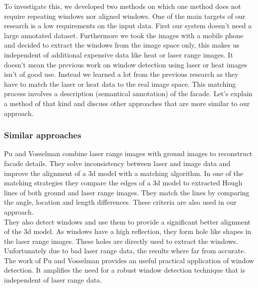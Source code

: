 
To investigate this, we developed two methods on which one method does not
require repeating windows nor aligned windows.  One of the main targets of our research
is a low requirements on the input data.  First our system doesn't need 
a large annotated dataset. Furthermore we took the images with a mobile phone
and decided to extract the windows from the image space only, this makes us
independent of additional expensive data like heat or laser range images.
It doesn't mean the previous work on window detection using laser or heat
images isn't of good use.  Instead we learned a lot from the previous research
as they have to match the laser or heat data to the real image space.  This
matching process involves a description (semantical annotation) of the facade.
Let's explain a method of that kind and discuss other approaches that are more
similar to our approach.\\

\subsubsection{Similar approaches}
Pu and Vosselman \cite{Pu_refiningbuilding} combine laser range images with
ground images to reconstruct facade details.  They solve inconsistency between
laser and image data and improve the alignment of a 3d model with a matching
algorithm.  In one of the matching strategies they compare the edges of a 3d
model to extracted Hough lines of both ground and laser range images.  They
match the lines by comparing the angle, location and length differences. These
criteria are also used in our approach.\\

They also detect windows and use them to provide a significant better alignment
of the 3d model.  As windows have a high reflection, they form hole like shapes
in the laser range images.  These holes are directly used to extract the
windows. Unfortunately due to bad laser range data, the results where far from
accurate.\\

The work of Pu and Vosselman \cite{Pu_refiningbuilding} provides an useful
practical application of window detection. It amplifies the need for a robust
window detection technique that is independent of laser range data.\\


